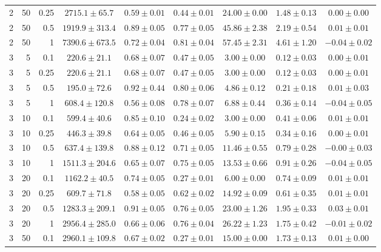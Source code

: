 \begin{table}[htbp]
\begin{tabular}{@{}rrrcccccc@{}}
2 & 50 & 0.25 & $2715.1 \pm 65.7$ & $0.59 \pm 0.01$ & $0.44 \pm 0.01$ & $24.00 \pm 0.00$ & $1.48 \pm 0.13$ & $0.00 \pm 0.00$ \\
2 & 50 & 0.5 & $1919.9 \pm 313.4$ & $0.89 \pm 0.05$ & $0.77 \pm 0.05$ & $45.86 \pm 2.38$ & $2.19 \pm 0.54$ & $0.01 \pm 0.01$ \\
2 & 50 & 1 & $7390.6 \pm 673.5$ & $0.72 \pm 0.04$ & $0.81 \pm 0.04$ & $57.45 \pm 2.31$ & $4.61 \pm 1.20$ & $-0.04 \pm 0.02$ \\
\midrule
3 & 5 & 0.1 & $220.6 \pm 21.1$ & $0.68 \pm 0.07$ & $0.47 \pm 0.05$ & $3.00 \pm 0.00$ & $0.12 \pm 0.03$ & $0.00 \pm 0.01$ \\
3 & 5 & 0.25 & $220.6 \pm 21.1$ & $0.68 \pm 0.07$ & $0.47 \pm 0.05$ & $3.00 \pm 0.00$ & $0.12 \pm 0.03$ & $0.00 \pm 0.01$ \\
3 & 5 & 0.5 & $195.0 \pm 72.6$ & $0.92 \pm 0.44$ & $0.80 \pm 0.06$ & $4.86 \pm 0.12$ & $0.21 \pm 0.18$ & $0.01 \pm 0.03$ \\
3 & 5 & 1 & $608.4 \pm 120.8$ & $0.56 \pm 0.08$ & $0.78 \pm 0.07$ & $6.88 \pm 0.44$ & $0.36 \pm 0.14$ & $-0.04 \pm 0.05$ \\
3 & 10 & 0.1 & $599.4 \pm 40.6$ & $0.85 \pm 0.10$ & $0.24 \pm 0.02$ & $3.00 \pm 0.00$ & $0.41 \pm 0.06$ & $0.01 \pm 0.01$ \\
3 & 10 & 0.25 & $446.3 \pm 39.8$ & $0.64 \pm 0.05$ & $0.46 \pm 0.05$ & $5.90 \pm 0.15$ & $0.34 \pm 0.16$ & $0.00 \pm 0.01$ \\
3 & 10 & 0.5 & $637.4 \pm 139.8$ & $0.88 \pm 0.12$ & $0.71 \pm 0.05$ & $11.46 \pm 0.55$ & $0.79 \pm 0.28$ & $-0.00 \pm 0.03$ \\
3 & 10 & 1 & $1511.3 \pm 204.6$ & $0.65 \pm 0.07$ & $0.75 \pm 0.05$ & $13.53 \pm 0.66$ & $0.91 \pm 0.26$ & $-0.04 \pm 0.05$ \\
3 & 20 & 0.1 & $1162.2 \pm 40.5$ & $0.74 \pm 0.05$ & $0.27 \pm 0.01$ & $6.00 \pm 0.00$ & $0.74 \pm 0.09$ & $0.01 \pm 0.01$ \\
3 & 20 & 0.25 & $609.7 \pm 71.8$ & $0.58 \pm 0.05$ & $0.62 \pm 0.02$ & $14.92 \pm 0.09$ & $0.61 \pm 0.35$ & $0.01 \pm 0.01$ \\
3 & 20 & 0.5 & $1283.3 \pm 209.1$ & $0.91 \pm 0.05$ & $0.76 \pm 0.05$ & $23.00 \pm 1.26$ & $1.95 \pm 0.33$ & $0.03 \pm 0.01$ \\
3 & 20 & 1 & $2956.4 \pm 285.0$ & $0.66 \pm 0.06$ & $0.76 \pm 0.04$ & $26.22 \pm 1.23$ & $1.75 \pm 0.42$ & $-0.01 \pm 0.02$ \\
3 & 50 & 0.1 & $2960.1 \pm 109.8$ & $0.67 \pm 0.02$ & $0.27 \pm 0.01$ & $15.00 \pm 0.00$ & $1.73 \pm 0.13$ & $0.01 \pm 0.00$ \\

\end{tabular}
\end{table}
